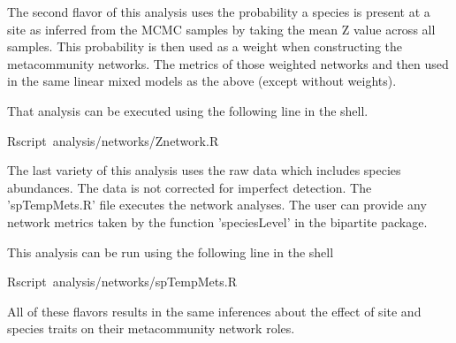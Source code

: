 \documentclass{article}\usepackage[]{graphicx}\usepackage[]{color}
\makeatletter
\newcommand{\hlopt}[1]{\textcolor[rgb]{0,0,0}{#1}}%
\newcommand{\hlstd}[1]{\textcolor[rgb]{0.345,0.345,0.345}{#1}}%
\newenvironment{kframe}{%
 \def\at@end@of@kframe{}%
 \ifinner\ifhmode%
  \def\at@end@of@kframe{\end{minipage}}%
  \begin{minipage}{\columnwidth}%
 \fi\fi%
 \def\FrameCommand##1{\hskip\@totalleftmargin \hskip-\fboxsep
 \colorbox{shadecolor}{##1}\hskip-\fboxsep
     \hskip-\linewidth \hskip-\@totalleftmargin \hskip\columnwidth}%
 \MakeFramed {\advance\hsize-\width
   \@totalleftmargin\z@ \linewidth\hsize
   \@setminipage}}%
 {\par\unskip\endMakeFramed%
 \at@end@of@kframe}
\newenvironment{knitrout}{}{} %
\makeatother
\begin{document}
The second flavor of this analysis uses the probability a species is
present at a site as inferred from the MCMC samples by taking the mean
Z value across all samples. This probability is then used as a weight
when constructing the metacommunity networks. The metrics of those
weighted networks and then used in the same linear mixed models as the
above (except without weights).

That analysis can be executed using the following line in the shell. 
\begin{knitrout}
\color{fgcolor}\begin{kframe}
\noindent
\ttfamily
\hlstd{Rscript\ analysis}\hlopt{/}\hlstd{networks}\hlopt{/}\hlstd{Znetwork.R}\hspace*{\fill}
\mbox{}
\normalfont
\end{kframe}
\end{knitrout}


The last variety of this analysis uses the raw data which includes
species abundances. The data is not corrected for imperfect detection.
The 'spTempMets.R' file executes the network analyses. The user can
provide any network metrics taken by the function 'speciesLevel' in
the bipartite package.

This analysis can be run using the following line in the shell

\begin{knitrout}
\color{fgcolor}\begin{kframe}
\noindent
\ttfamily
\hlstd{Rscript\ analysis}\hlopt{/}\hlstd{networks}\hlopt{/}\hlstd{spTempMets.R}\hspace*{\fill}
\mbox{}
\normalfont
\end{kframe}
\end{knitrout}


All of these flavors results in the same inferences about the effect
of site and species traits on their metacommunity network roles. 


\clearpage

\clearpage
\end{document}
